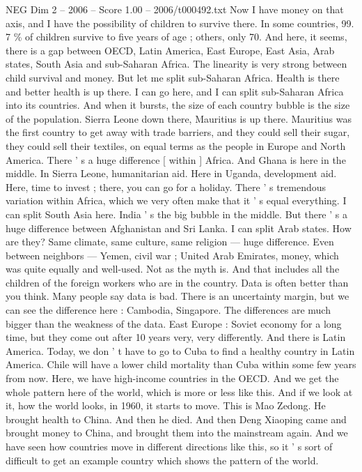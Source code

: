 \begin{textsample}{NEG Dim 2 – 2006 – Score 1.00 – 2006/t000492.txt}
Now I have money on that axis, and I have the possibility of children to survive there.
In some countries, 99. 7 \% of children survive to five years of age ; others, only 70.
And here, it seems, there is a gap between OECD, Latin America, East Europe, East Asia, Arab states, South Asia and sub-Saharan Africa.
The linearity is very strong between child survival and money.
But let me split sub-Saharan Africa.
Health is there and better health is up there.
I can go here, and I can split sub-Saharan Africa into its countries.
And when it bursts, the size of each country bubble is the size of the population.
Sierra Leone down there, Mauritius is up there.
Mauritius was the first country to get away with trade barriers, and they could sell their sugar, they could sell their textiles, on equal terms as the people in Europe and North America.
There ' s a huge difference [ within ] Africa.
And Ghana is here in the middle.
In Sierra Leone, humanitarian aid.
Here in Uganda, development aid.
Here, time to invest ; there, you can go for a holiday.
There ' s tremendous variation within Africa, which we very often make that it ' s equal everything.
I can split South Asia here.
India ' s the big bubble in the middle.
But there ' s a huge difference between Afghanistan and Sri Lanka.
I can split Arab states.
How are they?
Same climate, same culture, same religion — huge difference.
Even between neighbors — Yemen, civil war ; United Arab Emirates, money, which was quite equally and well-used.
Not as the myth is.
And that includes all the children of the foreign workers who are in the country.
Data is often better than you think.
Many people say data is bad.
There is an uncertainty margin, but we can see the difference here : Cambodia, Singapore.
The differences are much bigger than the weakness of the data.
East Europe : Soviet economy for a long time, but they come out after 10 years very, very differently.
And there is Latin America.
Today, we don ' t have to go to Cuba to find a healthy country in Latin America.
Chile will have a lower child mortality than Cuba within some few years from now.
Here, we have high-income countries in the OECD.
And we get the whole pattern here of the world, which is more or less like this.
And if we look at it, how the world looks, in 1960, it starts to move.
This is Mao Zedong.
He brought health to China.
And then he died.
And then Deng Xiaoping came and brought money to China, and brought them into the mainstream again.
And we have seen how countries move in different directions like this, so it ' s sort of difficult to get an example country which shows the pattern of the world.

\end{textsample}
